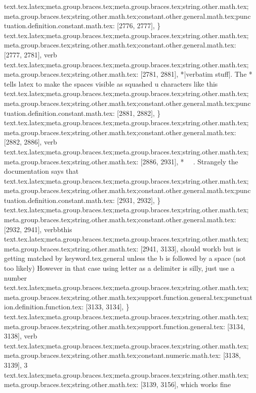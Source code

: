 {{{{{{{{{{{{{{{{{{{{{{{{{{{{{{{{{{{{{{{{{{{{{{{{{{{{{{{{{{{{{{{{{{{{{{{{{{{{{{{{{{{{{{{{{{{text.tex.latex;meta.group.braces.tex;meta.group.braces.tex;string.other.math.tex;meta.group.braces.tex;string.other.math.tex;constant.other.general.math.tex;punctuation.definition.constant.math.tex: [2776, 2777], {\}
text.tex.latex;meta.group.braces.tex;meta.group.braces.tex;string.other.math.tex;meta.group.braces.tex;string.other.math.tex;constant.other.general.math.tex: [2777, 2781], {verb}
text.tex.latex;meta.group.braces.tex;meta.group.braces.tex;string.other.math.tex;meta.group.braces.tex;string.other.math.tex: [2781, 2881], {*|verbatim stuff|.  The * tells latex to make the spaces visible as squashed u characters like this }
text.tex.latex;meta.group.braces.tex;meta.group.braces.tex;string.other.math.tex;meta.group.braces.tex;string.other.math.tex;constant.other.general.math.tex;punctuation.definition.constant.math.tex: [2881, 2882], {\}
text.tex.latex;meta.group.braces.tex;meta.group.braces.tex;string.other.math.tex;meta.group.braces.tex;string.other.math.tex;constant.other.general.math.tex: [2882, 2886], {verb}
text.tex.latex;meta.group.braces.tex;meta.group.braces.tex;string.other.math.tex;meta.group.braces.tex;string.other.math.tex: [2886, 2931], {*~ ~.  Strangely the documentation says that }
text.tex.latex;meta.group.braces.tex;meta.group.braces.tex;string.other.math.tex;meta.group.braces.tex;string.other.math.tex;constant.other.general.math.tex;punctuation.definition.constant.math.tex: [2931, 2932], {\}
text.tex.latex;meta.group.braces.tex;meta.group.braces.tex;string.other.math.tex;meta.group.braces.tex;string.other.math.tex;constant.other.general.math.tex: [2932, 2941], {verbbthis}
text.tex.latex;meta.group.braces.tex;meta.group.braces.tex;string.other.math.tex;meta.group.braces.tex;string.other.math.tex: [2941, 3133], { should workb but  is getting matched by keyword.tex.general unless the b is followed by  a space (not too likely) However in that case using letter as a delimiter is silly, just use a number }
text.tex.latex;meta.group.braces.tex;meta.group.braces.tex;string.other.math.tex;meta.group.braces.tex;string.other.math.tex;support.function.general.tex;punctuation.definition.function.tex: [3133, 3134], {\}
text.tex.latex;meta.group.braces.tex;meta.group.braces.tex;string.other.math.tex;meta.group.braces.tex;string.other.math.tex;support.function.general.tex: [3134, 3138], {verb}
text.tex.latex;meta.group.braces.tex;meta.group.braces.tex;string.other.math.tex;meta.group.braces.tex;string.other.math.tex;constant.numeric.math.tex: [3138, 3139], {3}
text.tex.latex;meta.group.braces.tex;meta.group.braces.tex;string.other.math.tex;meta.group.braces.tex;string.other.math.tex: [3139, 3156], {which works fine }
}}}}}}}}}}}}}}}}}}}}}}}}}}}}}}}}}}}}}}}}}}}}}}}}}}}}}}}}}}}}}}}}}}}}}}}}}}}}}}}}}}}}}}}}}}}}}}}

